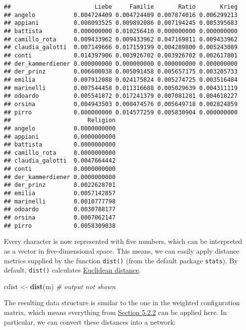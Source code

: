 \documentclass[]{book}
\newenvironment{Shaded}{\begin{snugshade}}{\end{snugshade}}
\newcommand{\CommentTok}[1]{\textcolor[rgb]{0.56,0.35,0.01}{\textit{#1}}}
\newcommand{\KeywordTok}[1]{\textcolor[rgb]{0.13,0.29,0.53}{\textbf{#1}}}
\newcommand{\NormalTok}[1]{#1}
\newcommand{\StringTok}[1]{\textcolor[rgb]{0.31,0.60,0.02}{#1}}
\begin{document}
\begin{verbatim}
##                        Liebe     Familie       Ratio       Krieg
## angelo           0.004724409 0.004724409 0.007874016 0.006299213
## appiani          0.008093525 0.009892086 0.007194245 0.005395683
## battista         0.000000000 0.010256410 0.000000000 0.000000000
## camillo_rota     0.009433962 0.009433962 0.047169811 0.009433962
## claudia_galotti  0.007149666 0.017159199 0.004289800 0.005243089
## conti            0.014397906 0.003926702 0.003926702 0.002617801
## der_kammerdiener 0.000000000 0.000000000 0.000000000 0.000000000
## der_prinz        0.006600038 0.005091458 0.005657175 0.003205733
## emilia           0.007912088 0.024175824 0.005274725 0.003516484
## marinelli        0.007544458 0.011316688 0.005029639 0.004311119
## odoardo          0.005541872 0.017241379 0.007081281 0.004618227
## orsina           0.004943503 0.008474576 0.005649718 0.002824859
## pirro            0.000000000 0.014577259 0.005830904 0.000000000
##                      Religion
## angelo           0.0000000000
## appiani          0.0000000000
## battista         0.0000000000
## camillo_rota     0.0000000000
## claudia_galotti  0.0047664442
## conti            0.0000000000
## der_kammerdiener 0.0000000000
## der_prinz        0.0022628701
## emilia           0.0057142857
## marinelli        0.0010777798
## odoardo          0.0030788177
## orsina           0.0007062147
## pirro            0.0058309038
\end{verbatim}

Every character is now represented with five numbers, which can be interpreted as a vector in five-dimensional space. This means, we can easily apply distance metrics supplied by the function \texttt{dist()} (from the default package \texttt{stats}). By default, \texttt{dist()} calculates \href{https://en.wikipedia.org/wiki/Euclidean_distance}{Euclidean distance}.

\begin{Shaded}
\begin{Highlighting}[]
\NormalTok{cdist <-}\StringTok{ }\KeywordTok{dist}\NormalTok{(m)}
\CommentTok{# output not shown}
\end{Highlighting}
\end{Shaded}

The resulting data structure is similar to the one in the weighted configuration matrix, which means everything from \protect\hyperlink{network}{Section 5.2.2} can be applied here.
In particular, we can convert these distances into a network:
\end{document}

